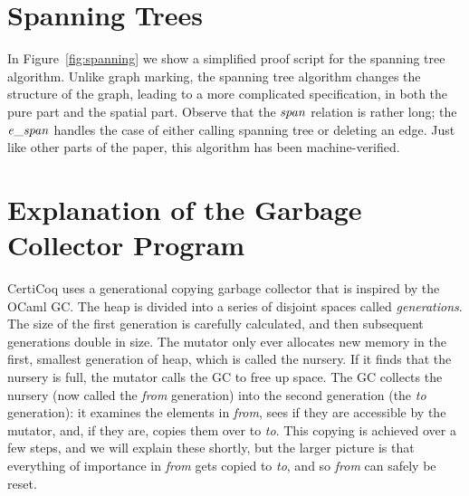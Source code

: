 \appendix

\section{Spanning Trees}
\label{apx:spanning}


In Figure~\ref{fig:spanning} we show a simplified proof script for
the spanning tree algorithm.  Unlike graph marking, the spanning tree algorithm changes the
structure of the graph, leading to a more complicated specification,
in both the pure part and the spatial part. Observe that the $\mathit{span}$ relation is
rather long; the $\mathit{e\_span}$ handles the case of either calling spanning tree or deleting an edge.
Just like other parts of the paper, this algorithm has been machine-verified.

\section{Explanation of the Garbage Collector Program}
\label{apx:gcstructure}


CertiCoq uses a generational copying garbage collector 
that is inspired by the OCaml GC. 
The heap is divided into a series of disjoint
spaces called \emph{generations}. The size of the first generation
is carefully calculated, and then subsequent generations
double in size.
The mutator only ever allocates new memory in the first, 
smallest generation of heap, which is called the nursery. 
If it finds that the nursery is full, 
the mutator calls the GC to free up space.
The GC collects the nursery 
(now called the \emph{from} generation)
into the second generation (the \emph{to} generation): 
it examines the elements 
in \emph{from}, sees if they are accessible by
the mutator, and, if they are, 
copies them over to \emph{to}. This copying is achieved over a few steps, 
and we will explain these shortly, but the larger picture is that 
everything of importance in \emph{from} gets copied to \emph{to}, 
and so \emph{from} can safely be reset. 

